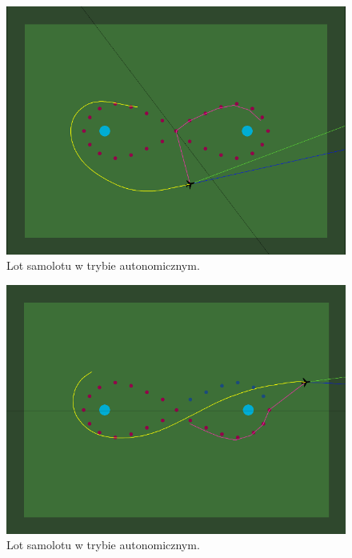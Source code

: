 \documentclass[12pt, a4paper]{article}
\begin{document}
 \begin{figure}[H]
    \centering
    \includegraphics[width=1\textwidth]{aileci1}
    \caption{Lot samolotu w trybie autonomicznym.}
    \label{fig:leci1}
\end{figure}

 \begin{figure}[H]
    \centering
    \includegraphics[width=1\textwidth]{aileci2}
    \caption{Lot samolotu w trybie autonomicznym.}
    \label{fig:leci2}
\end{figure}
\end{document}
